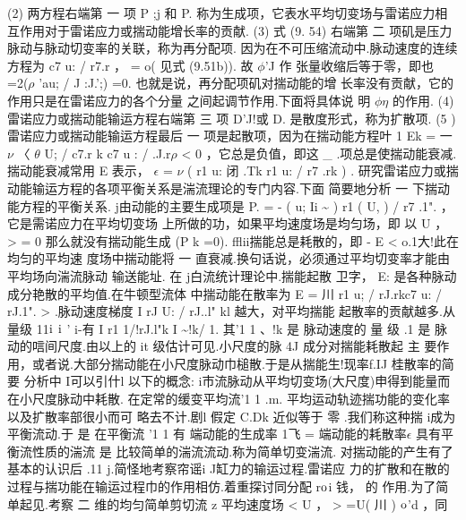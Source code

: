 (2) 两方程右端第 一 项 P ;j 和 P. 称为生成项，它表水平均切变场与雷诺应力相 互作用对于雷诺应力或揣动能增长率的贡献. (3) 式 (9. 54) 右端第 二 项矶是压力脉动与脉动切变率的关联，称为再分配项. 因为在不可压缩流动中.脉动速度的连续方程为 c7 u: / r7.r ， = o( 见式 (9.51b)). 故 $\phi$'J 作 张量收缩后等于零，即也 =2($\rho$ 'au; / J :J.';) =0. 也就是说，再分配项矶对揣动能的增 长率没有贡献，它的作用只是在雷诺应力的各个分量 之间起调节作用.下面将具体说 明 $\phi$$\eta$ 的作用. (4) 雷诺应力或揣动能输运方程右端第 三 项 D'J!或 D. 是散度形式，称为扩散项. (5 )雷诺应力或揣动能输运方程最后 一 项是起散项，因为在揣动能方程叶 1 Ek = 一 $\nu$ 〈 $\theta$ U; / c7.r k c7 u : / .J.r$\rho$ < 0 ，它总是负值，即这 \_ .项总是使揣动能衰减.揣动能衰减常用 E 表示， $\epsilon$ = $\nu$ ( r1 u: 闭 .Tk r1 u: / r7 .rk ) . 研究雷诺应力或揣动能输运方程的各项平衡关系是湍流理论的专门内容.下面 简要地分析 一 下揣动能方程的平衡关系. j由动能的主要生成项是 P. = - ( u; Ii \textasciitilde{} ) r1 ( U, ) / r7 .1". ，它是需诺应力在平均切变场 上所做的功，如果平均速度场是均匀场，即 以 U ， > = 0 那么就没有揣动能生成 (P k =0). fflii揣能总是耗散的，即 - E < o.1大!此在均匀的平均速 度场中揣动能将 一 直衰减.换句话说，必须通过平均切变率才能由平均场向湍流脉动 输送能址. 在 j白流统计理论中.揣能起散 卫字， E: 是各种脉动成分艳散的平均值.在牛顿型流体 中揣动能在散率为 E = 川 r1 u; / rJ.rkc7 u: / rJ.1". > .脉动速度梯度 I rJ U: / rJ..l" kl 越大，对平均揣能 起散率的贡献越多.从量级 11${\rm i}$ ${\rm i}$ ' i-有 I r1 1/!rJ.l"k I \textasciitilde{}!k/ 1. 其'1 1 、!k 是 脉动速度的 量 级 .1 是 脉动的唁间尺度.由以上的 it 级估计可见.小尺度的脉 4J 成分对揣能耗散起 主 要作 用，或者说.大部分揣动能在小尺度脉动巾槌散.于是从揣能生!现率f.IJ 桂散率的简要 分析中 I可以引什l 以下的概念: i市流脉动从平均切变场(大尺度)申得到能量而在小尺度脉动中耗散. 在定常的缓变平均流'1 1 .m. 平均运动轨迹揣功能的变化率以及扩散率部很小而可 略去不计.剧l 假定 C.Dk 近似等于 零 .我们称这种揣 i成为平衡流动.于 是 在平衡流 '1 1 有 端动能的生成率 1飞 = 端动能的耗散率$\epsilon$ 具有平衡流性质的湍流 是 比较简单的湍流流动.称为简单切变湍流. 对揣动能的产生有了基本的认识后 .11 j.简怪地考察帘谣i J缸力的输运过程.雷诺应 力的扩散和在散的过程与揣功能在输运过程巾的作用相仿.着重探讨同分配 r${\rm o}$i 钱， 的 作用.为了简单起见.考察 二 维的均匀简单剪切流 z 平均速度场 < U ， > =U( 川 ) ${\rm o}$'d ，同

